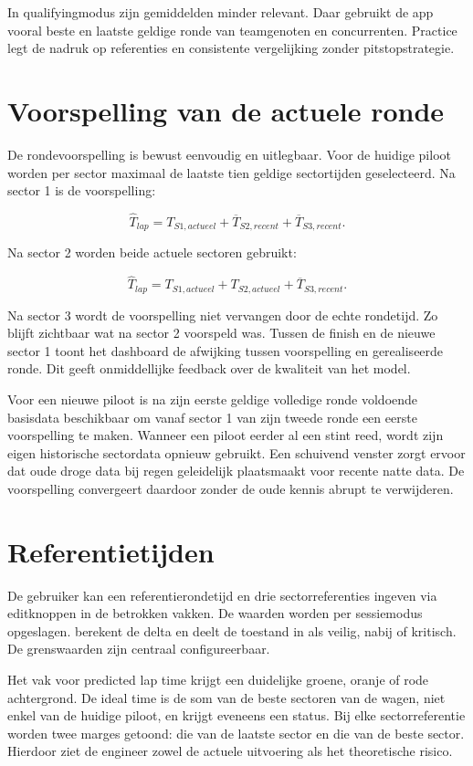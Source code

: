 In qualifyingmodus zijn gemiddelden minder relevant. Daar gebruikt de app vooral beste en laatste geldige ronde van teamgenoten en concurrenten. Practice legt de nadruk op referenties en consistente vergelijking zonder pitstopstrategie.

\section{Voorspelling van de actuele ronde}
De rondevoorspelling is bewust eenvoudig en uitlegbaar. Voor de huidige piloot worden per sector maximaal de laatste tien geldige sectortijden geselecteerd. Na sector 1 is de voorspelling:

\[
  \hat{T}_{lap} = T_{S1,actueel} + \overline{T}_{S2,recent} + \overline{T}_{S3,recent}.
\]

Na sector 2 worden beide actuele sectoren gebruikt:

\[
  \hat{T}_{lap} = T_{S1,actueel} + T_{S2,actueel} + \overline{T}_{S3,recent}.
\]

Na sector 3 wordt de voorspelling niet vervangen door de echte rondetijd. Zo blijft zichtbaar wat na sector 2 voorspeld was. Tussen de finish en de nieuwe sector 1 toont het dashboard de afwijking tussen voorspelling en gerealiseerde ronde. Dit geeft onmiddellijke feedback over de kwaliteit van het model.

Voor een nieuwe piloot is na zijn eerste geldige volledige ronde voldoende basisdata beschikbaar om vanaf sector 1 van zijn tweede ronde een eerste voorspelling te maken. Wanneer een piloot eerder al een stint reed, wordt zijn eigen historische sectordata opnieuw gebruikt. Een schuivend venster zorgt ervoor dat oude droge data bij regen geleidelijk plaatsmaakt voor recente natte data. De voorspelling convergeert daardoor zonder de oude kennis abrupt te verwijderen.

\section{Referentietijden}
De gebruiker kan een referentierondetijd en drie sectorreferenties ingeven via editknoppen in de betrokken vakken. De waarden worden per sessiemodus opgeslagen.  berekent de delta en deelt de toestand in als veilig, nabij of kritisch. De grenswaarden zijn centraal configureerbaar.

Het vak voor predicted lap time krijgt een duidelijke groene, oranje of rode achtergrond. De ideal time is de som van de beste sectoren van de wagen, niet enkel van de huidige piloot, en krijgt eveneens een status. Bij elke sectorreferentie worden twee marges getoond: die van de laatste sector en die van de beste sector. Hierdoor ziet de engineer zowel de actuele uitvoering als het theoretische risico.

